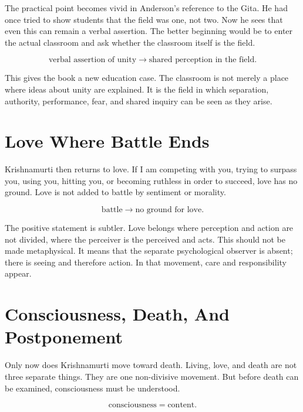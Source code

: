 \documentclass[11pt,oneside]{book}
\begin{document}
The practical point becomes vivid in Anderson's reference to the Gita. He had once tried to show students that the field was one, not two. Now he sees that even this can remain a verbal assertion. The better beginning would be to enter the actual classroom and ask whether the classroom itself is the field.

\begin{equation}
\text{verbal assertion of unity}
\longrightarrow
\text{shared perception in the field}.
\end{equation}

This gives the book a new education case. The classroom is not merely a place where ideas about unity are explained. It is the field in which separation, authority, performance, fear, and shared inquiry can be seen as they arise.

\section{Love Where Battle Ends}

Krishnamurti then returns to love. If I am competing with you, trying to surpass you, using you, hitting you, or becoming ruthless in order to succeed, love has no ground. Love is not added to battle by sentiment or morality.

\begin{equation}
\text{battle}
\longrightarrow
\text{no ground for love}.
\end{equation}

The positive statement is subtler. Love belongs where perception and action are not divided, where the perceiver is the perceived and acts. This should not be made metaphysical. It means that the separate psychological observer is absent; there is seeing and therefore action. In that movement, care and responsibility appear.

\section{Consciousness, Death, And Postponement}

Only now does Krishnamurti move toward death. Living, love, and death are not three separate things. They are one non-divisive movement. But before death can be examined, consciousness must be understood.

\begin{equation}
\text{consciousness} = \text{content}.
\end{equation}
\end{document}
